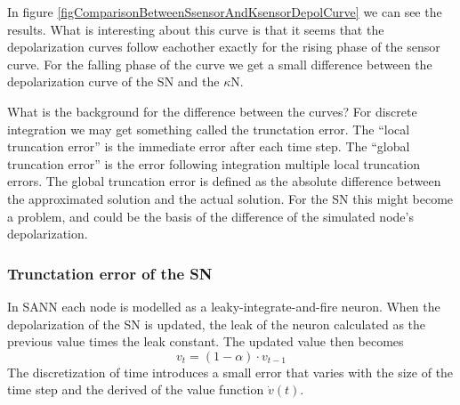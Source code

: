 In figure \ref{figComparisonBetweenSsensorAndKsensorDepolCurve} we can see the results. 
What is interesting about this curve is that it seems that the depolarization curves follow eachother exactly %
for the rising phase of the sensor curve. 
For the falling phase of the curve we get a small difference between the depolarization curve of the SN and the $\kappa$N.


What is the background for the difference between the curves?
For discrete integration we may get something called the trunctation error. 
The ``local truncation error'' is the immediate error after each time step. 
The ``global truncation error'' is the error following integration multiple local truncation errors. 
The global truncation error is defined as the absolute difference between the approximated solution and the actual solution. 
For the SN this might become a problem, and could be the basis of the difference of the simulated node's depolarization.%














	\subsubsection{Trunctation error of the SN} %
	\label{ssecTruncationErrorOfSN}
In SANN each node is modelled as a leaky-integrate-and-fire neuron.
When the depolarization of the SN is updated, the leak of the neuron calculated as the previous value times the leak constant.
The updated value then becomes %
\begin{equation}
	v_t =  (1-\alpha) \cdot v_{t-1}  
	\label{eqLekkasjeAnalyseAvTruncationError}
\end{equation}
The discretization of time introduces a small error that varies with the size of the time step and the derived of the value function $\dot{v}(t)$.







